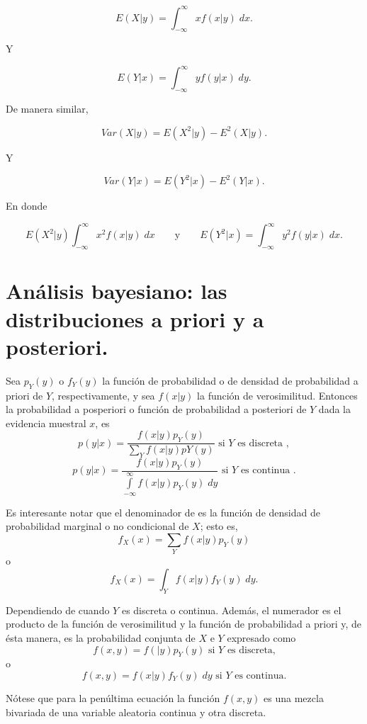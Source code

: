 \begin{tcolorbox}
    $$E(X|y)=\int_{-\infty}^\infty xf(x|y)\; dx.$$
\end{tcolorbox}

Y 

\begin{tcolorbox}
    $$E(Y|x)=\int_{-\infty}^\infty yf(y|x)\; dy.$$
\end{tcolorbox}

De manera similar,

\begin{tcolorbox}
    $$Var(X|y)=E\left(X^2|y\right)-E^2(X|y).$$
\end{tcolorbox}

Y 

\begin{tcolorbox}
    $$Var(Y|x)=E\left(Y^2|x\right)-E^2(Y|x).$$
\end{tcolorbox}

En donde 

$$E\left(X^2|y\right)\int_{-\infty}^\infty x^2 f(x|y)\; dx \qquad \mbox{y}\qquad E\left(Y^2|x\right)=\int_{-\infty}^\infty y^2f(y|x)\; dx.$$


\section{Análisis bayesiano: las distribuciones a priori y a posteriori.}

\begin{teo}
    Sea $p_Y(y)$ o $f_Y(y)$ la función de probabilidad o de densidad de probabilidad a priori de $Y$, respectivamente, y sea $f(x|y)$ la función de verosimilitud. Entonces la probabilidad a posperiori o función de probabilidad a posteriori de $Y$ dada la evidencia muestral $x$, es
    $$p(y|x)=\dfrac{f(x|y)p_Y(y)}{\sum\limits_{Y}f(x|y)pY(y)} \mbox{ si } Y \mbox{ es discreta },$$
    $$p(y|x)=\dfrac{f(x|y)p_Y(y)}{\int\limits_{-\infty}^\infty f(x|y)p_Y(y)\; dy} \mbox{ si } Y \mbox{ es continua }.$$
\end{teo}

Es interesante notar que el denominador de es la función de densidad de probabilidad marginal o no condicional de $X$; esto es,
$$f_X(x)=\sum_Y f(x|y)p_Y(y)$$
o 
$$f_X(x)=\int_Y f(x|y)f_Y(y)\; dy.$$

Dependiendo de cuando $Y$ es discreta o continua. Además, el numerador es el producto de la función de verosimilitud y la función de probabilidad a priori y, de ésta manera, es la probabilidad conjunta de $X$ e $Y$ expresado como
$$f(x,y)=f(|y)p_Y(y) \mbox{ si } Y \mbox{ es discreta,}$$
o
$$f(x,y)=f(x|y)f_Y(y)\; dy \mbox{ si } Y \mbox{ es continua.}$$

Nótese que para la penúltima ecuación la función $f(x,y)$ es una mezcla bivariada de una variable aleatoria continua y otra discreta.
